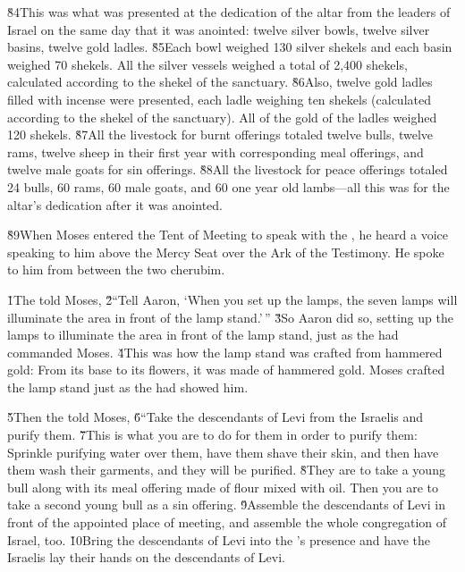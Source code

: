 \v{84}This was what was presented at the dedication of the altar from the leaders of Israel on the same day that it was anointed: twelve silver bowls, twelve silver basins, twelve gold ladles. \v{85}Each bowl weighed 130 silver shekels and each basin weighed 70 shekels. All the silver vessels weighed a total of 2,400 shekels, calculated according to the shekel of the sanctuary. \v{86}Also, twelve gold ladles filled with incense were presented, each ladle weighing ten shekels (calculated according to the shekel of the sanctuary). All of the gold of the ladles weighed 120 shekels. \v{87}All the livestock for burnt offerings totaled twelve bulls, twelve rams, twelve sheep in their first year with corresponding meal offerings, and twelve male goats for sin offerings. \v{88}All the livestock for peace offerings totaled 24 bulls, 60 rams, 60 male goats, and 60 one year old lambs---all this was for the altar's dedication after it was anointed.

\v{89}When Moses entered the Tent of Meeting to speak with the , he heard a voice speaking to him above the Mercy Seat over the Ark of the Testimony. He spoke to him from between the two cherubim.

\v{1}The  told Moses, \v{2}``Tell Aaron, `When you set up the lamps, the seven lamps will illuminate the area in front of the lamp stand.'\,'' \v{3}So Aaron did so, setting up the lamps to illuminate the area in front of the lamp stand, just as the  had commanded Moses. \v{4}This was how the lamp stand was crafted from hammered gold: From its base to its flowers, it was made of hammered gold. Moses crafted the lamp stand just as the  had showed him.

\v{5}Then the  told Moses, \v{6}``Take the descendants of Levi from the Israelis and purify them. \v{7}This is what you are to do for them in order to purify them: Sprinkle purifying water over them, have them shave their skin, and then have them wash their garments, and they will be purified. \v{8}They are to take a young bull along with its meal offering made of flour mixed with oil. Then you are to take a second young bull as a sin offering. \v{9}Assemble the descendants of Levi in front of the appointed place of meeting, and assemble the whole congregation of Israel, too. \v{10}Bring the descendants of Levi into the 's presence and have the Israelis lay their hands on the descendants of Levi.

